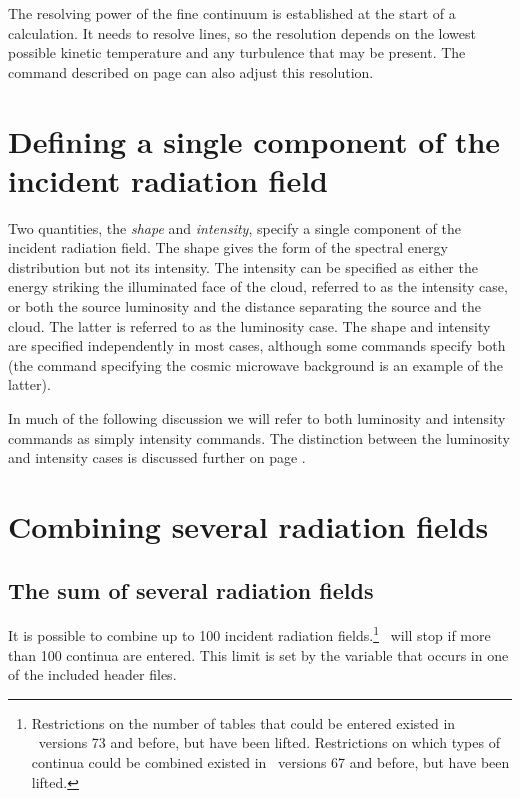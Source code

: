 The resolving power of the fine continuum is established at the start of a calculation.
It needs to resolve lines, so the resolution depends on the lowest possible kinetic temperature
and any turbulence that may be present.
The  command described on 
page \pageref{sec:CommandSetFineContinuum}
can also adjust this resolution.

\section{Defining a single component of the incident radiation field}

Two quantities, the \emph{shape} and \emph{intensity},
specify a single component of the incident radiation field.
The shape gives the form of the spectral energy distribution
but not its intensity.
The intensity can be specified as either the energy striking
the illuminated face of the cloud, referred to as
the intensity case, or both the source luminosity and the
distance separating the source and the cloud.  
The latter is referred to as the luminosity case.
The shape and intensity are specified independently
in most cases, although some commands specify both 
(the command specifying
the cosmic microwave background is an example of the latter).

In much of the following discussion we will refer to both
luminosity and intensity commands as simply intensity commands.
The distinction between the luminosity and intensity cases
is discussed further on page \pageref{sec:IntensityLuminosityCases}.

\section{Combining several radiation fields}

\subsection{The sum of several radiation fields}

It is possible to combine up to 100 incident radiation fields.\footnote{
Restrictions on the number of tables that could be entered existed
in \Cloudy\ versions 73 and before, but have been lifted. Restrictions on
which types of continua could be combined existed in \Cloudy\ versions 67
and before, but have been lifted.}   \Cloudy\ will stop if
more than 100 continua are entered.
This limit is set by the variable 
that occurs in one of the included header files.

